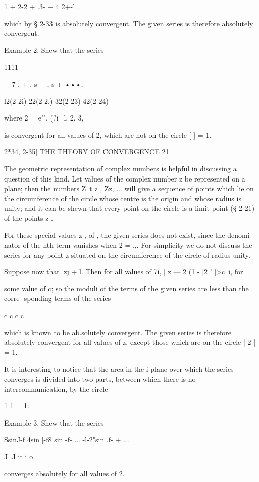 1 + 2-2 + .3- + 4 2+-' .

which by § 2-33 is absolutely convergent. The given series is
therefore absolutely convergeut.

Example 2. Shew that the series

1111

+ 7 , + , s + , s + •••,



l2(2-2i) 22(2-2,) 32(2-23) 42(2-24)

where 2 = e'", (?i=l, 2, 3,

is convergent for all values of 2, which are not on the circle [ ] =
1.



2*34, 2-35] THE THEORY OF CONVERGENCE 21

The geometric representation of complex numbers is helpful in
discussing a question of this kind. Let values of the complex number z
be represented on a plane; then the numbers Z\ t z , Zz, ... will
give a sequence of points which lie on the circumference of the circle
whose centre is the origin and whose radius is unity; and it can be
shewn that every point on the circle is a limit-point (§ 2-21) of the
points z . -—

For these special values z-, of , the given series does not exist,
since the denomi- nator of the nth term vanishes when 2 = ,,. For
simplicity we do not discuss the series for any point z situated on
the circumference of the circle of radius unity.

Suppose now that [zj + l. Then for all values of 7i, | z — 2 (1 - [2 '
|>c~i, for

some value of c; so the moduli of the terms of the given series are
less than the corre- sponding terms of the series

c c c c

which is known to be ab.solutely convergent. The given series is
therefore absolutely convergent for all values of z, except those
which are on the circle | 2 | = 1.

It is interesting to notice that the area in the i-plane over which
the series converges is divided into two parts, between which there is
no intercommunication, by the circle

1 1 = 1.

Example 3. Shew that the series

SsinJ-f 4sin |-f8 sin -f- ... -l-2"sin .f- + ...

 J .J it i o

converges absolutely for all values of 2.

